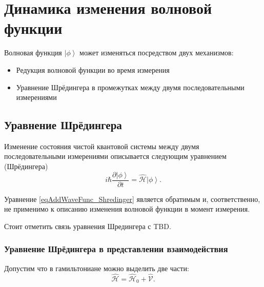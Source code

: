 \section{Динамика изменения волновой функции}
\label{AddWaveFunc}
Волновая функция $\left| \phi \right>$ может изменяться посредством
двух механизмов:
\begin{itemize}
\item Редукция волновой функции во время измерения
\item Уравнение Шрёдингера в промежутках между двумя последовательными
  измерениями 
\end{itemize}

\subsection{Уравнение Шрёдингера}
Изменение состояния чистой квантовой системы между двумя
последовательными измерениями описывается следующим уравнением (Шрёдингера)
\begin{equation}
i \hbar \frac{\partial \left| \phi \right>}{\partial t} = \hat{\mathcal{H}}
\left| \phi \right>.
\label{eqAddWaveFunc_Shredinger}
\end{equation}

Уравнение \eqref{eqAddWaveFunc_Shredinger} является обратимым и,
соответственно, не применимо к описанию изменения волновой функции в
момент измерения.

Стоит отметить связь уравнения Шредингера с 
 TBD.

\subsubsection{Уравнение Шрёдингера в представлении взаимодействия}
\label{AddWaveFuncInter}
Допустим что в гамильтониане можно выделить две части:
\begin{equation}
\hat{\mathcal{H}} = \hat{\mathcal{H}}_0 + \hat{\mathcal{V}}.
\nonumber
\end{equation}

